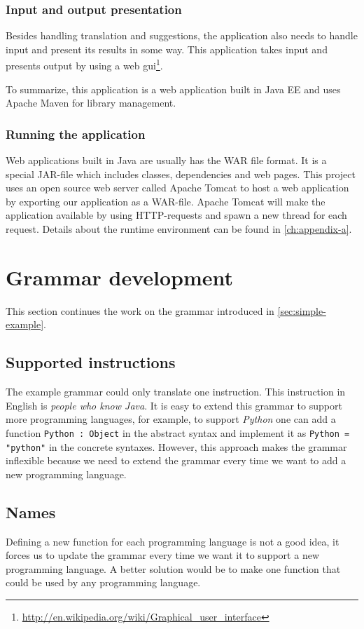 \subsubsection*{Input and output presentation}
Besides handling translation and suggestions, the application also needs to handle input and present its results in some way. This application takes input and presents output by using a web gui\footnote{\url{http://en.wikipedia.org/wiki/Graphical_user_interface}}.

To summarize, this application is a web application built in Java EE and uses Apache Maven for library management.

\subsubsection{Running the application}
Web applications built in Java are usually has the WAR file format. It is a special JAR-file which includes classes, dependencies and web pages. This project uses an open source web server called Apache Tomcat to host a web application by exporting our application as a WAR-file. Apache Tomcat will make the application available by using HTTP-requests and spawn a new thread for each request.
\newline
\newline
Details about the runtime environment can be found in \autoref{ch:appendix-a}.

\section{Grammar development}
This section continues the work on the grammar introduced in \autoref{sec:simple-example}.

\subsection{Supported instructions}
The example grammar could only translate one instruction. This instruction in English is \emph{people who know Java}. It is easy to extend this grammar to support more programming languages, for example, to support \emph{Python} one can add a function \texttt{Python : Object} in the abstract syntax and implement it as \texttt{Python = "python"} in the concrete syntaxes. However, this approach makes the grammar inflexible because we need to extend the grammar every time we want to add a new programming language.

\subsection{Names}
Defining a new function for each programming language is not a good idea, it forces us to update the grammar every time we want it to support a new programming language. A better solution would be to make one function that could be used by any programming language.

